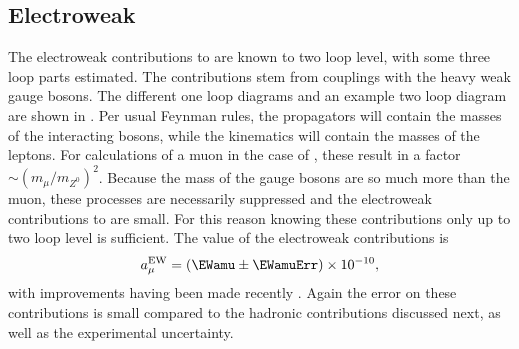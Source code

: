\subsection{Electroweak}
\label{subsec:Electroweak}

The electroweak contributions to \amu are known to two loop level, with some three loop parts estimated. The contributions stem from couplings with the heavy weak gauge bosons. The different one loop diagrams and an example two loop diagram are shown in . Per usual Feynman rules, the propagators will contain the masses of the interacting bosons, while the kinematics will contain the masses of the leptons. For calculations of a muon in the case of , these result in a factor $\sim(m_{\mu}/m_{Z^{0}})^{2}$. Because the mass of the gauge bosons are so much more than the muon, these processes are necessarily suppressed and the electroweak contributions to \amu are small. For this reason knowing these contributions only up to two loop level is sufficient. The value of the electroweak contributions is
		\begin{align}
            a_{\mu}^{\text{EW}} = (\EWamu \pm \EWamuErr) \times 10^{-10},
		\end{align}
with improvements having been made recently \cite{EW1,EW2}. Again the error on these contributions is small compared to the hadronic contributions discussed next, as well as the experimental uncertainty.


